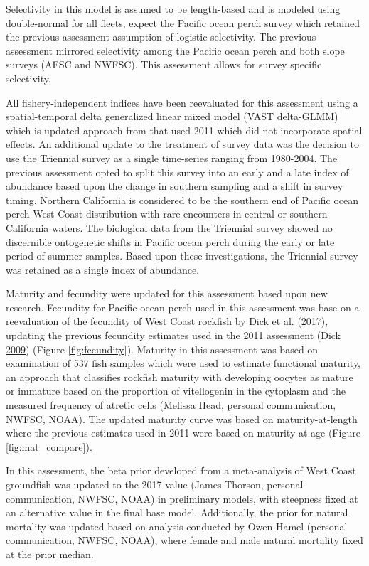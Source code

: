 \documentclass[12pt,]{article}
\begin{document}
Selectivity in this model is assumed to be length-based and is modeled
using double-normal for all fleets, expect the Pacific ocean perch
survey which retained the previous assessment assumption of logistic
selectivity. The previous assessment mirrored selectivity among the
Pacific ocean perch and both slope surveys (AFSC and NWFSC). This
assessment allows for survey specific selectivity.

All fishery-independent indices have been reevaluated for this
assessment using a spatial-temporal delta generalized linear mixed model
(VAST delta-GLMM) which is updated approach from that used 2011 which
did not incorporate spatial effects. An additional update to the
treatment of survey data was the decision to use the Triennial survey as
a single time-series ranging from 1980-2004. The previous assessment
opted to split this survey into an early and a late index of abundance
based upon the change in southern sampling and a shift in survey timing.
Northern California is considered to be the southern end of Pacific
ocean perch West Coast distribution with rare encounters in central or
southern California waters. The biological data from the Triennial
survey showed no discernible ontogenetic shifts in Pacific ocean perch
during the early or late period of summer samples. Based upon these
investigations, the Triennial survey was retained as a single index of
abundance.

Maturity and fecundity were updated for this assessment based upon new
research. Fecundity for Pacific ocean perch used in this assessment was
base on a reevaluation of the fecundity of West Coast rockfish by Dick
et al. (\protect\hyperlink{ref-dick_meta-analysis_2017}{2017}), updating
the previous fecundity estimates used in the 2011 assessment (Dick
\protect\hyperlink{ref-dick_modeling_2009}{2009}) (Figure
\ref{fig:fecundity}). Maturity in this assessment was based on
examination of 537 fish samples which were used to estimate functional
maturity, an approach that classifies rockfish maturity with developing
oocytes as mature or immature based on the proportion of vitellogenin in
the cytoplasm and the measured frequency of atretic cells (Melissa Head,
personal communication, NWFSC, NOAA). The updated maturity curve was
based on maturity-at-length where the previous estimates used in 2011
were based on maturity-at-age (Figure \ref{fig:mat_compare}).

In this assessment, the beta prior developed from a meta-analysis of
West Coast groundfish was updated to the 2017 value (James Thorson,
personal communication, NWFSC, NOAA) in preliminary models, with
steepness fixed at an alternative value in the final base model.
Additionally, the prior for natural mortality was updated based on
analysis conducted by Owen Hamel (personal communication, NWFSC, NOAA),
where female and male natural mortality fixed at the prior median.
\end{document}
